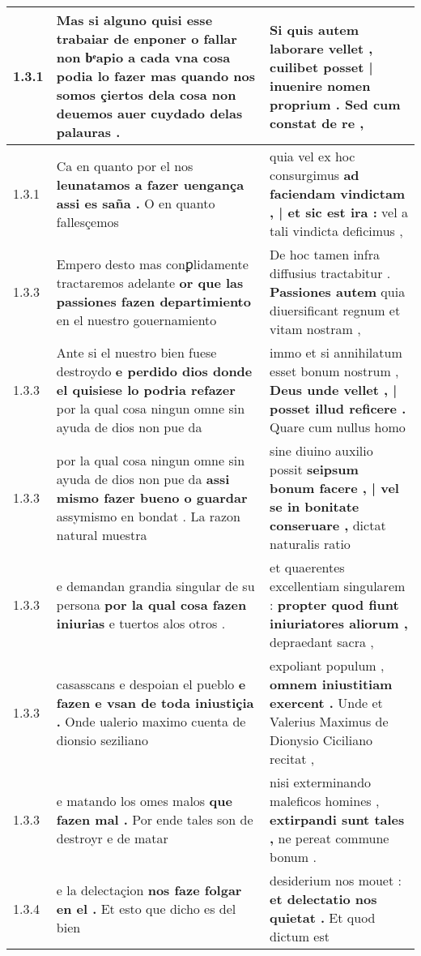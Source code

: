 \begin{tabular}{|p{1cm}|p{6.5cm}|p{6.5cm}|}
1.3.1 & Mas si alguno quisi esse trabaiar de enponer o fallar \textbf{ non bͤapio a cada vna cosa podia lo fazer } mas quando nos somos çiertos dela cosa non deuemos auer cuydado delas palauras . & Si quis autem laborare vellet , \textbf{ cuilibet posset | inuenire nomen proprium . } Sed cum constat de re , \\\hline
1.3.1 & Ca en quanto por el nos \textbf{ leunatamos a fazer uengança assi es saña . } O en quanto fallesçemos & quia vel ex hoc consurgimus \textbf{ ad faciendam vindictam , | et sic est ira : } vel a tali vindicta deficimus , \\\hline
1.3.3 & Empero desto mas conꝑlidamente tractaremos adelante \textbf{ or que las passiones fazen departimiento } en el nuestro gouernamiento & De hoc tamen infra diffusius tractabitur . \textbf{ Passiones autem } quia diuersificant regnum et vitam nostram , \\\hline
1.3.3 & Ante si el nuestro bien fuese destroydo \textbf{ e perdido dios donde el quisiese lo podria refazer } por la qual cosa ningun omne sin ayuda de dios non pue da & immo et si annihilatum esset bonum nostrum , \textbf{ Deus unde vellet , | posset illud reficere . } Quare cum nullus homo \\\hline
1.3.3 & por la qual cosa ningun omne sin ayuda de dios non pue da \textbf{ assi mismo fazer bueno o guardar } assymismo en bondat . La razon natural muestra & sine diuino auxilio possit \textbf{ seipsum bonum facere , | vel se in bonitate conseruare , } dictat naturalis ratio \\\hline
1.3.3 & e demandan grandia singular de su persona \textbf{ por la qual cosa fazen iniurias } e tuertos alos otros . & et quaerentes excellentiam singularem : \textbf{ propter quod fiunt iniuriatores aliorum , } depraedant sacra , \\\hline
1.3.3 & casasscans e despoian el pueblo \textbf{ e fazen e vsan de toda iniustiçia . } Onde ualerio maximo cuenta de dionsio seziliano & expoliant populum , \textbf{ omnem iniustitiam exercent . } Unde et Valerius Maximus de Dionysio Ciciliano recitat , \\\hline
1.3.3 & e matando los omes malos \textbf{ que fazen mal . } Por ende tales son de destroyr e de matar & nisi exterminando maleficos homines , \textbf{ extirpandi sunt tales , } ne pereat commune bonum . \\\hline
1.3.4 & e la delectaçion \textbf{ nos faze folgar en el . } Et esto que dicho es del bien & desiderium nos mouet : \textbf{ et delectatio nos quietat . } Et quod dictum est \\\hline

\end{tabular}
